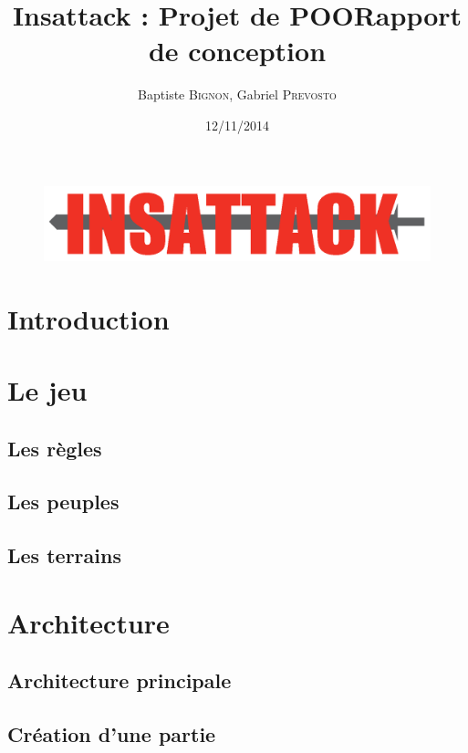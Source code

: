 \documentclass[12pt]{article}
\title{Insattack : Projet de POO\smallbreak Rapport de conception}
\author{Baptiste \textsc{Bignon}, Gabriel \textsc{Prevosto}}
\date{12/11/2014}
\begin{document}
\maketitle
\vfill %

\begin{figure}[!h]
\centering
\includegraphics[width=\textwidth]{Parties/Images/Logo}
\label{fig:logo}
\end{figure}

\vfill
\vfill
\newpage

\tableofcontents
\renewcommand{\contentsname}{Sommaire}
\newpage


\section{Introduction}			\label{sec:introduction}
\newpage

\section{Le jeu}				\label{sec:jeu}
\subsection{Les règles}			\label{sec:regles}
\subsection{Les peuples}			\label{peuples}
\subsection{Les terrains}			\label{terrains}
\newpage

\section{Architecture}			\label{sec:archi}
\subsection{Architecture principale}	\label{sec:architecturePrincipale}
\subsection{Création d'une partie}	\label{sec:creationPartie}
\end{document}
